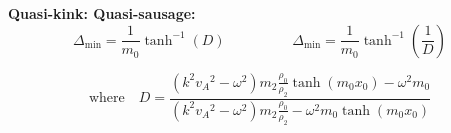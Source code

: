 \documentclass[table]{beamer}
\begin{document}
\begin{frame}
\vspace{0.3cm}
\begin{block}{\textbf{Quasi-kink: \hspace{3.5cm} Quasi-sausage:}}
\vspace{-0.3cm}
\begin{equation*}
\Delta_\mathrm{min} = \frac{1}{m_0}\tanh^{-1}(D)
\hspace{2cm}
\Delta_\mathrm{min} = \frac{1}{m_0}\tanh^{-1}\left( \frac{1}{D} \right)
\end{equation*}
\end{block}

\begin{equation*}
\text{where} \quad
D = \frac{(k^2{v_A}^2-\omega^2)m_2\frac{\rho_0}{\rho_2}\tanh({m_0}x_0) - \omega^2{m_0}}{(k^2{v_A}^2-\omega^2)m_2\frac{\rho_0}{\rho_2} - \omega^2{m_0}\tanh({m_0}x_0)}
\end{equation*}
\end{frame}
\end{document}
